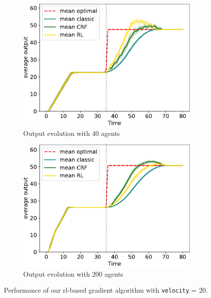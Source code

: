 \begin{figure}[t!]
  \begin{subfigure}[t]{\figfactor\textwidth}
    \centering
    \includegraphics[width=\textwidth]{papers/coordination2022/img/output-few-nodes.pdf}
    \caption{Output evolution with 40 agents}
    \label{coordination2022:subfig:output-few}
  \end{subfigure}
  \hfill
  \begin{subfigure}[t]{\figfactor\textwidth}
    \centering
    \includegraphics[width=\textwidth]{papers/coordination2022/img/output-many-nodes.pdf}
    \caption{Output evolution with 200 agents}
    \label{coordination2022:subfig:output-many}
  \end{subfigure}
  \caption{Performance of our \ac{rl}-based gradient algorithm with \lstinline|velocity| = 20.
  }
  \label{coordination2022:fig:eval}
\end{figure}